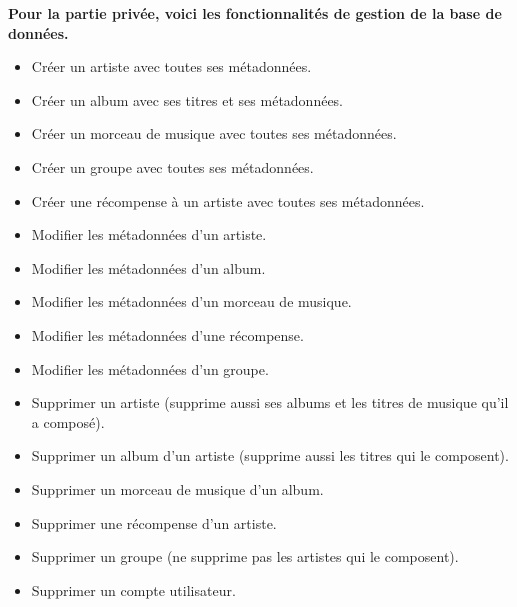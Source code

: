         \begin{paragraphe}
            \textbf{Pour la partie privée, voici les fonctionnalités de gestion de la base de
            données.}
            \vspace{1em}
            \begin{itemize}
                \item Créer un artiste avec toutes ses métadonnées.
                \item Créer un album avec ses titres et ses métadonnées.
                \item Créer un morceau de musique avec toutes ses métadonnées.
                \item Créer un groupe avec toutes ses métadonnées.
                \item Créer une récompense à un artiste avec toutes ses métadonnées.
            \end{itemize}
            \vspace{1em}
            \begin{itemize}
                \item Modifier les métadonnées d'un artiste.
                \item Modifier les métadonnées d'un album.
                \item Modifier les métadonnées d'un morceau de musique.
                \item Modifier les métadonnées d'une récompense.
                \item Modifier les métadonnées d'un groupe.
            \end{itemize}
            \vspace{1em}
            \begin{itemize}
                \item Supprimer un artiste (supprime aussi ses albums et les titres de
                musique qu'il a composé).
                \item Supprimer un album d'un artiste (supprime aussi les titres qui le composent).
                \item Supprimer un morceau de musique d'un album.
                \item Supprimer une récompense d'un artiste.
                \item Supprimer un groupe (ne supprime pas les artistes qui le composent).
                \item Supprimer un compte utilisateur.
            \end{itemize}

\end{paragraphe}
